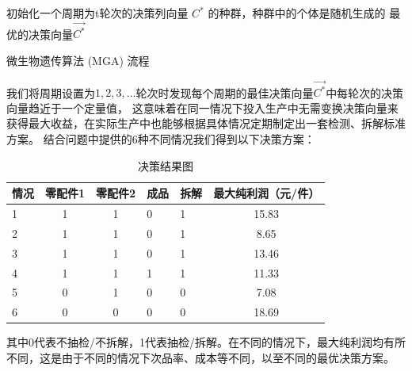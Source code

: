 \documentclass[withoutpreface,bwprint]{cumcmthesis} %
\begin{document}
\begin{adjustbox}{width=16cm,height=6.5cm}
	\centering
	\begin{algorithm}[H]
		\SetAlgoLined
		初始化一个周期为t轮次的决策列向量 $C^{*}$ 的种群，种群中的个体是随机生成的\;
		\Return 最优的决策向量$\vec{C^{*}}$
		\caption{微生物遗传算法 (MGA) 流程}
	\end{algorithm}
\end{adjustbox}
我们将周期设置为$1,2,3,\dots$轮次时发现每个周期的最佳决策向量$\vec{C^{*}}$中每轮次的决策向量趋近于一个定量值，
这意味着在同一情况下投入生产中无需变换决策向量来获得最大收益，在实际生产中也能够根据具体情况定期制定出一套检测、拆解标准方案。
结合问题中提供的6种不同情况我们得到以下决策方案：
\begin{longtable}{m{1.5cm}<{\centering}ccm{1.5cm}<{\centering}m{1.5cm}<{\centering}c}
	\caption{决策结果图}
	\label{tab:my-table}                    \\
	\hline
	情况 & 零配件1 & 零配件2 & 成品 & 拆解 & 最大纯利润（元/件） \\ \hline
	\endfirsthead
	\endhead
	\hline
	\endfoot
	\endlastfoot
	1  & 1    & 1    & 0  & 1  & 15.83      \\
	2  & 1    & 1    & 0  & 1  & 8.65       \\
	3  & 1    & 1    & 0  & 1  & 13.46      \\
	4  & 1    & 1    & 1  & 1  & 11.33      \\
	5  & 0    & 1    & 0  & 0  & 7.08       \\
	6  & 0    & 0    & 0  & 0  & 18.69      \\ \hline
\end{longtable}
其中0代表不抽检/不拆解，1代表抽检/拆解。在不同的情况下，最大纯利润均有所不同，这是由于不同的情况下次品率、成本等不同，以至不同的最优决策方案。
\end{document}

